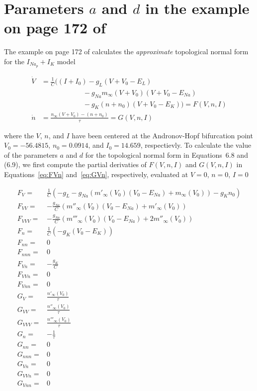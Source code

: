 \documentclass{article}
\theoremstyle{lemma}
\begin{document}
\section{Parameters $a$ and $d$ in the example on page 172 of
\citet{izhikevich07}}
\label{sec:adExampleP172}

The example on page 172 of \citet{izhikevich07} calculates the
\emph{approximate} topological normal form for the $I_{Na_p}+I_K$ model

\begin{align}
\dot{V}&=\frac{1}{C}((I+I_0)-g_L(V+V_0-E_L)\nonumber\\
&\qquad\qquad\qquad-g_{Na}m_\infty(V+V_0)(V+V_0-E_{Na})\nonumber\\
&\qquad\qquad\qquad-g_K(n+n_0)(V+V_0-E_K))=F(V,n,I)\label{eq:FVn}\\
\dot{n}&=\frac{n_\infty(V+V_0)-(n+n_0)}{\tau}=G(V,n,I)\label{eq:GVn}
\end{align}

\noindent where the $V$, $n$, and $I$ have been centered at the Andronov-Hopf
bifurcation point $V_0=-56.4815$, $n_0=0.0914$, and $I_0=14.659$,
respectievly.  To calculate the value of the parameters $a$ and $d$ for the
topological normal form in Equations~6.8 and (6.9), we first compute the
partial derivaties of $F(V,n,I)$ and $G(V,n,I)$ in Equations~\ref{eq:FVn}
and~\ref{eq:GVn}, respectively, evaluated at $V=0$, $n=0$, $I=0$

\begin{align}
F_V=&\frac{1}{C}(-g_L-g_{Na}(m'_\infty(V_0)(V_0-E_{Na})+m_\infty(V_0))-g_Kn_0)\nonumber\\
F_{VV}=&-\frac{g_{Na}}{C}(m''_\infty(V_0)(V_0-E_{Na})+m'_\infty(V_0))\nonumber\\
F_{VVV}=&-\frac{g_{Na}}{C}(m'''_\infty(V_0)(V_0-E_{Na})+2m''_\infty(V_0))\nonumber\\
F_n=&\frac{1}{C}(-g_K(V_0-E_K))\nonumber\\
F_{nn}=&0\nonumber\\
F_{nnn}=&0\nonumber\\
F_{Vn}=&-\frac{g_{K}}{C}\nonumber\\
F_{VVn}=&0\nonumber\\
F_{Vnn}=&0\nonumber\\
G_V=&\frac{n'_\infty(V_0)}{\tau}\nonumber\\
G_{VV}=&\frac{n''_\infty(V_0)}{\tau}\nonumber\\
G_{VVV}=&\frac{n'''_\infty(V_0)}{\tau}\nonumber\\
G_n=&-\frac{1}{\tau}\nonumber\\
G_{nn}=&0\nonumber\\
G_{nnn}=&0\nonumber\\
G_{Vn}=&0\nonumber\\
G_{VVn}=&0\nonumber\\
G_{Vnn}=&0\nonumber
\end{align}
\end{document}
